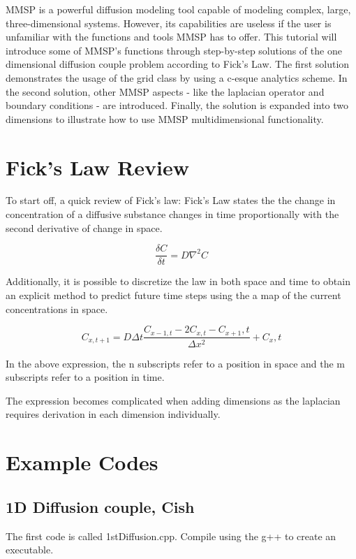 \documentclass{article}
\begin{document}
MMSP is a powerful diffusion modeling tool capable of modeling complex, large, three-dimensional systems. However, its capabilities are useless if the user is unfamiliar with the functions and tools MMSP has to offer. This tutorial will introduce some of MMSP’s functions through step-by-step solutions of the one dimensional diffusion couple problem according to Fick’s Law.  The first solution demonstrates the usage of the grid class by using a c-esque analytics scheme.  In the second solution, other MMSP aspects - like the laplacian operator and boundary conditions - are introduced. Finally, the solution is expanded into two dimensions to illustrate how to use MMSP multidimensional functionality. 


\section{Fick's Law Review}

To start off, a quick review of Fick’s law:  Fick’s Law states the the change in concentration of a diffusive substance changes in time proportionally with the second derivative of change in space.

$$\frac{\delta C}{\delta t}=D\nabla ^2C$$

Additionally, it is possible to discretize the law in both space and time to obtain an explicit method to predict future time steps using the a map of the current concentrations in space. 

$$C_{x,t+1} = D\Delta t\frac{C_{x-1,t} - 2C_{x,t} - C_{x+1},t }{ \Delta x^2} + C_x,t $$

In the above expression, the n subscripts refer to a position in space and the m subscripts refer to a position in time.

The expression becomes complicated when adding dimensions as the laplacian requires derivation in each dimension individually.   


\section{Example Codes}
\label{sec:examples}

\subsection{1D Diffusion couple, Cish}

The first code is called 1stDiffusion.cpp.  Compile using the g++ to create an executable.
\end{document}
